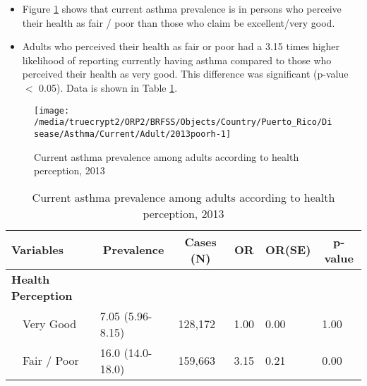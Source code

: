  \begin{itemize}

\item Figure \ref{fig:fairpoor.Asthma.2013} shows that current asthma prevalence is 
 in persons who perceive their health as fair / poor than those who claim be excellent/very good.

\item Adults who perceived their health as fair or poor had a 3.15 times higher likelihood of reporting currently having asthma compared to those who perceived their health as very good. This difference was significant (p-value $<$ 0.05). Data is shown in Table \ref{tab:fairpoor.Asthma.2013}.

\end{itemize}

\begin{figure}[H]
\caption{Current asthma prevalence among adults according to health perception,
         2013}
\label{fig:fairpoor.Asthma.2013}

\begin{knitrout}
\color{fgcolor}

{\centering \texttt{[image: /media/truecrypt2/ORP2/BRFSS/Objects/Country/Puerto\_Rico/Disease/Asthma/Current/Adult/2013poorh-1]} 

}



\end{knitrout}
 \end{figure}

\begin{table}[H]
\caption{Current asthma prevalence  among adults according to health perception, 2013\label{tab:fairpoor.Asthma.2013}} 
\begin{center}
\begin{tabular}{llllll}
\hline\hline
\multicolumn{1}{l}{Variables}&\multicolumn{1}{c}{Prevalence}&\multicolumn{1}{c}{Cases (N)}&\multicolumn{1}{c}{OR}&\multicolumn{1}{c}{OR(SE)}&\multicolumn{1}{c}{p-value}\tabularnewline
\hline
{\bfseries Health Perception}&&&&&\tabularnewline
~~Very Good&7.05 (5.96-8.15)&128,172&1.00&0.00&1.00\tabularnewline
~~Fair / Poor&16.0 (14.0-18.0)&159,663&3.15&0.21&0.00\tabularnewline
\hline
\end{tabular}\end{center}

\end{table}

